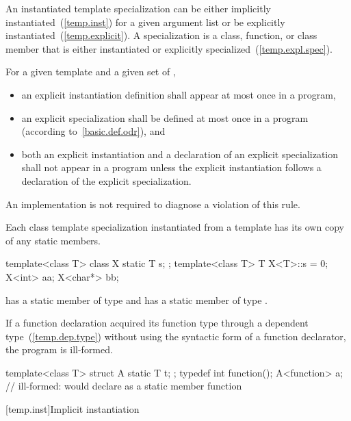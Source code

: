 \pnum
An instantiated template specialization can be either implicitly
instantiated~(\ref{temp.inst}) for a given argument list or be explicitly
instantiated~(\ref{temp.explicit}).
A specialization is a class, function, or class member that is either
instantiated or explicitly specialized~(\ref{temp.expl.spec}).

\pnum
For a given template and a given set of
,
\begin{itemize}
\item
an explicit instantiation definition shall appear at most once in a program,
\item
an explicit specialization shall be defined at most once
in a program (according to~\ref{basic.def.odr}), and
\item
both an explicit instantiation and a declaration of an
explicit specialization shall not appear in a program unless
the explicit instantiation follows a declaration of the explicit
specialization.
\end{itemize}
An implementation is not required to diagnose a violation of this rule.

\pnum
Each class template specialization instantiated from a template has its own
copy of any static members.
\begin{example}

\begin{codeblock}
template<class T> class X {
  static T s;
};
template<class T> T X<T>::s = 0;
X<int> aa;
X<char*> bb;
\end{codeblock}

has a static member
of type
and
has a static member
of type
.
\end{example}

\pnum
If a function declaration acquired its function type through
a dependent type~(\ref{temp.dep.type}) without using the syntactic form of
a function declarator, the program is ill-formed.
\begin{example}

\begin{codeblock}
template<class T> struct A {
  static T t;
};
typedef int function();
A<function> a;                  // ill-formed: would declare  as a static member function
\end{codeblock}
\end{example}

[temp.inst]{Implicit instantiation}

